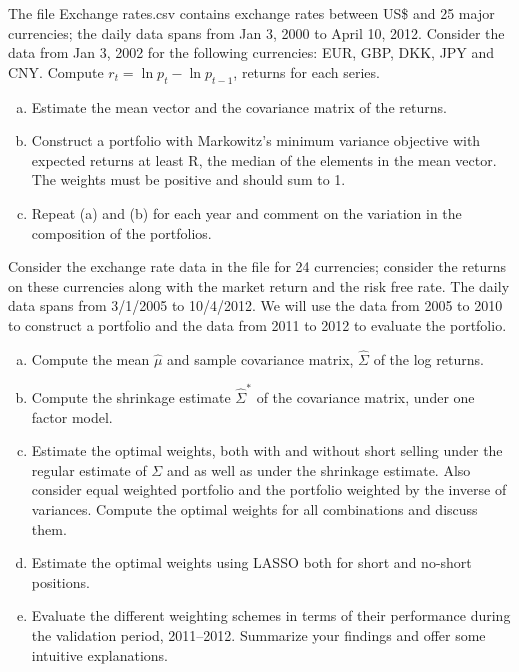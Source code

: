     
\prob The file Exchange rates.csv contains exchange rates between US\$ and 25 major currencies; the daily data spans from Jan 3, 2000 to April 10, 2012. Consider the data from Jan 3, 2002 for the following currencies: EUR, GBP, DKK, JPY and CNY. Compute $r_t = \ln{p_t} - \ln{p_{t-1}}$, returns for each series. \\

	\begin{enumerate}[(a)]
	\item Estimate the mean vector and the covariance matrix of the returns.
	\item Construct a portfolio with Markowitz's minimum variance objective with expected returns at least R, the median of the elements in the mean vector. The weights must be positive and should sum to 1.
	\item Repeat (a) and (b) for each year and comment on the variation in the composition of the portfolios. \twomedskip
	\end{enumerate}



\prob Consider the exchange rate data in the file  for 24 currencies; consider the returns on these currencies along with the market return and the risk free rate. The daily data spans from 3/1/2005 to 10/4/2012. We will use the data from 2005 to 2010 to construct a portfolio and the data from 2011 to 2012 to evaluate the portfolio.
	\begin{enumerate}[(a)]
	\item Compute the mean $\hat{\mu}$ and sample covariance matrix, $\hat{\Sigma}$ of the log returns.
	\item Compute the shrinkage estimate $\hat{\Sigma}^*$ of the covariance matrix, under one factor model.
	\item Estimate the optimal weights, both with and without short selling under the regular estimate of $\Sigma$ and as well as under the shrinkage estimate. Also consider equal weighted portfolio and the portfolio weighted by the inverse of variances. Compute the optimal weights for all combinations and discuss them.
	\item Estimate the optimal weights using LASSO both for short and no-short positions.
	\item Evaluate the different weighting schemes in terms of their performance during the validation period, 2011--2012. Summarize your findings and offer some intuitive explanations. \twomedskip
	\end{enumerate}


